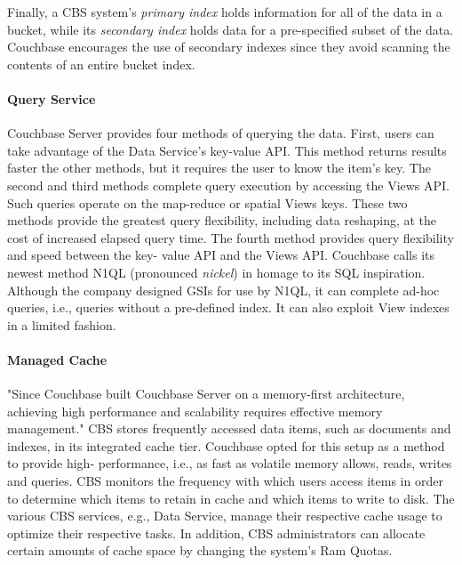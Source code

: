 \documentclass[9pt,twocolumn,twoside]{styles/osajnl}
\begin{document}
Finally, a CBS system's \textit{primary index} holds information for all of the data
in a bucket, while its \textit{secondary index} holds data for a pre-specified
subset of the data. Couchbase encourages the use of secondary indexes since they
avoid scanning the contents of an entire bucket index.

\paragraph{Query Service} Couchbase Server provides four methods of querying
the data.  First, users can take advantage of the Data Service's key-value API.
This method returns results faster the other methods, but it requires the user
to know the item's key.  The second and third methods complete query execution
by accessing the Views API.  Such queries operate on the map-reduce or spatial
Views keys.  These two methods provide the greatest query flexibility, including
data reshaping, at the cost of increased elapsed query time.  The fourth method
provides query flexibility and speed between the key- value API and the Views
API.  Couchbase calls its newest method N1QL (pronounced \textit{nickel}) in
homage to its SQL inspiration. Although the company designed GSIs for use by
N1QL, it can complete ad-hoc queries, i.e., queries without a pre-defined index.
It can also exploit View indexes in a limited fashion.

\paragraph{Managed Cache} "Since Couchbase built Couchbase Server on a
memory-first architecture, achieving high performance and scalability requires
effective memory management."\cite{www-cachinglayer-cbsinc}  CBS stores
frequently accessed data items, such as documents and indexes, in its integrated
cache tier.  Couchbase opted for this setup as a method to provide high-
performance, i.e., as fast as volatile memory allows, reads, writes and queries.
CBS monitors the frequency with which users access items in order to determine
which items to retain in cache and which items to write to disk.  The various
CBS services, e.g., Data Service, manage their respective cache usage to
optimize their respective tasks. In addition, CBS administrators can allocate
certain amounts of cache space by changing the system's Ram Quotas.
\cite{www-cachinglayer-cbsinc}
\end{document}
